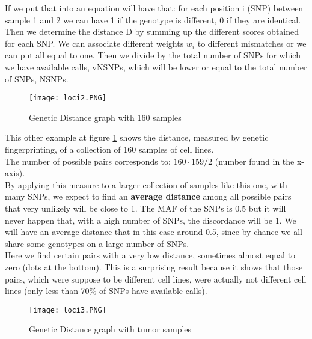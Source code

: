 If we put that into an equation will have that: for each position i (SNP) between sample 1 and 2 we can have 1 if the genotype is different, 0 if they are identical. Then we determine the distance D by summing up the different scores obtained for each SNP. We can associate different weights $w_i$ to different mismatches or we can put all equal to one. Then we divide by the total number of SNPs for which we have available calls, vNSNPs, which will be lower or equal to the total number of SNPs, NSNPs.

\begin{figure}[H]
	\centering
	\texttt{[image: loci2.PNG]}
	\caption{Genetic Distance graph with 160 samples}
	\label{fig:Distance2}
\end{figure}

This other example at figure \ref{fig:Distance2} shows the distance, measured by genetic fingerprinting, of a collection of 160 samples of cell lines.
\\
The number of possible pairs corresponds to: $160 \cdot 159 / 2$ (number found in the x-axis).
\\
By applying this measure to a larger collection of samples like this one, with many SNPs, we expect to find an \textbf{average distance} among all possible pairs that very unlikely will be close to 1.
The MAF of the SNPs is 0.5 but it will never happen that, with a high number of SNPs, the discordance will be 1. We will have an average distance that in this case around 0.5, since by chance we all share some genotypes on a large number of SNPs.
\\
Here we find certain pairs with a very low distance, sometimes almost equal to zero (dots at the bottom). This is a surprising result because it shows that those pairs, which were suppose to be different cell lines, were actually not different cell lines (only less than 70\% of SNPs have available calls).

\begin{figure}[H]
	\centering
	\texttt{[image: loci3.PNG]}
	\caption{Genetic Distance graph with tumor samples}
	\label{fig:Distance3}
\end{figure}



